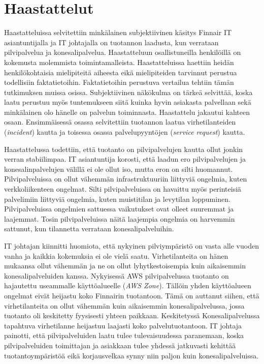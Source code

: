 \section{Haastattelut}
Haastatteluissa selvitettiin minkälainen subjektiivinen käsitys Finnair IT asiantuntijalla ja IT johtajalla on tuotannon laadusta, kun verrataan pilvipalvelua ja konesalipalvelua. Haastatteluun osallistuneilla henkilöillä on kokemusta molemmista toimintamalleista. Haastatteluissa haettiin heidän henkilökohtaisia mielipiteitä aiheesta eikä mielipiteiden tarvinnut perustua todellisiin faktatietoihin. Faktatietoihin perustuva vertailua tehtiin tämän tutkimuksen muissa osissa. Subjektiivinen näkökulma on tärkeä selvittää, koska laatu perustuu myös tuntemukseen siitä kuinka hyvin asiakasta palvellaan sekä minkälainen olo hänelle on palvelun toiminnasta. Haastattelu jakautui kahteen osaan. Ensimmäisessä osassa selvitettiin tuotannon laatua virhetilanteiden (\emph{incident}) kautta ja toisessa osassa palvelupyyntöjen (\emph{service request}) kautta.

Haastattelussa todettiin, että tuotanto on pilvipalvelujen kautta ollut jonkin verran stabiilimpaa. IT asiantuntija korosti, että laadun ero pilvipalvelujen ja konesalinpalvelujen välillä ei ole ollut iso, mutta eron on silti huomannut. Pilvipalveluissa on ollut vähemmän infrastruktuuriin liittyviä ongelmia, kuten verkkoliikenteen ongelmat. Silti pilvipalveluissa on havaittu myös perinteisiä palvelimiin liittyviä ongelmia, kuten muistitilan ja levytilan loppuminen. Pilvipalveluissa ongelmien sattuessa vaikutukset ovat olleet suuremmat ja laajemmat. Tosin pilvipalveluissa näitä laajempia ongelmia on harvemmin sattunut, kun tilannetta verrataan konesalipalveluihin.

IT johtajan kiinnitti huomiota, että nykyinen pilviympäristö on vasta alle vuoden vanha ja kaikkia kokemuksia ei ole vielä saatu. Virhetilanteita on hänen mukaansa ollut vähemmän ja ne on ollut lyhytkestoisempia kuin aikaisemmin konesalipalveluiden kanssa. Nykyisessä AWS pilvipalvelussa tuotanto on hajautettu useammalle käyttöalueelle (\emph{AWS Zone}). Tällöin yhden käyttöalueen ongelmat eivät heijastu koko Finnairin tuotantoon. Tämä on auttanut siihen, että virhetilanteita on ollut vähemmän kuin aikaisemmin konesalipalvelussa, jossa tuotanto oli keskitetty fyysisesti yhteen paikkaan. Keskitetyssä Konesalipalvelussa tapahtuva virhetilanne heijastuu laajasti koko palvelutuotantoon. IT johtaja painotti, että pilvipalveluiden laatu tulee tulevaisuudessa paranemaan, koska pilvipalveluiden toimittajan ja asiakkaan tulee yhdessä jatkuvasti kehittää tuotantoympäristöä eikä korjausvelkaa synny niin paljon kuin konesalipalveluissa.

